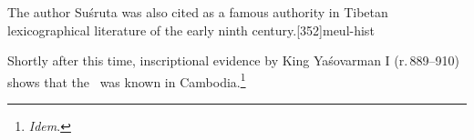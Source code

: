 The author Suśruta was also cited as a famous authority in Tibetan
lexicographical literature of the early ninth
century.[352]{meul-hist}
                                
Shortly after this time, inscriptional evidence by King Yaśovarman I
(r.\,889--910) shows that the \SS\ was known in
Cambodia.\footnote{\emph{Idem}.}
                                    

%
%
%
